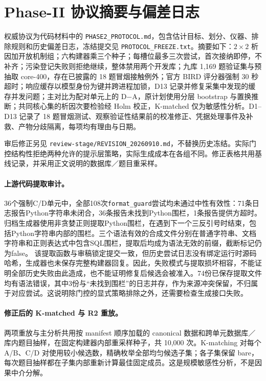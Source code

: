 \section{Phase-II 协议摘要与偏差日志}\label{app:phase2-protocol}
权威协议为代码材料中的 \texttt{PHASE2\_PROTOCOL.md}，包含估计目标、划分、仪器、排除规则和历史偏差日志，冻结提交见 \texttt{PROTOCOL\_FREEZE.txt}。摘要如下：$2\times2$ 析因加开放机制组；六构建器乘三个种子；每槽位最多三次尝试，首次接纳即停，不补齐；污染登记失败则拒绝继续，整体禁用两个开发库；九库 1,169 题验证集与预抽取 core-400，存在已披露的 18 题冒烟接触例外；官方 BIRD 评分器强制 30 秒超时；响应缓存以模型身份为键并跨进程加锁，D13 记录并修复采集中发现的缓存并发问题；主对比为配对单元上的 D$-$A，原计划使用分层 bootstrap 与置换推断；共同核心集的析因次要检验经 Holm 校正，K-matched 仅为敏感性分析。D1--D13 记录了 18 题冒烟测试、观察验证性结果前的校准修正、凭据处理事件及补救、产物分歧隔离，每项均有理由与日期。

审后修正另见 \texttt{review-stage/REVISION\_20260910.md}，不替换历史冻结。实际门控结构性拒绝两种允许的提示层策略，实际生成成本在各组不同。修正表格共用基线记录，并采用正文说明的数据库／题目重采样。
\paragraph{上游代码提取审计。}\label{app:extraction}
36个强制C/D单元中，全部108次\texttt{format\_guard}尝试均未通过中性有效性：71条日志报告Python字符串未闭合，36条报告未找到Python围栏，1条报告提供方超时。归档生成器使用非贪婪正则提取Python围栏，在遇到下一个三反引号时结束，包括Python字符串内部的围栏。三个语法有效的合成文件分别在普通字符串、文档字符串和正则表达式中包含SQL围栏，提取后均成为语法无效的前缀，截断标记仍为false。
该提取函数与审稿锁定提交一致，但历史尝试日志没有绑定运行时源码哈希，生成器也未保存完整构建器回复。因此，失败模式与提取损坏相容，不能证明全部历史失败由此造成，也不能证明修复后候选会被准入。74份已保存提取文件均有语法错误，其中3份与“未找到围栏”的日志并存，作为来源冲突保留，不归属于对应尝试。这说明除门控的显式策略排除之外，还需要检查生成接口失败。

\paragraph{修正后的 K-matched 与 R2 重放。}\label{app:r2}
两项重放与主分析共用按 manifest 顺序加载的 canonical 数据和跨单元数据库／库内题目抽样，在固定构建器内部重采样种子，共 10,000 次。K-matching 对每个 A/B、C/D 对使用较小候选数，精确枚举全部均匀候选子集；各子集保留 bare，每次题目抽样都在子集内部重新计算最佳固定成员。这是规模敏感性分析，不是因果中介分解。

